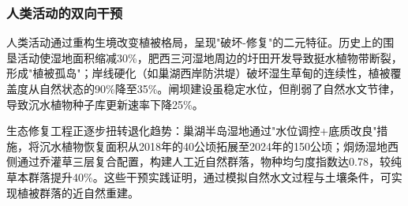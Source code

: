 \subsubsection{人类活动的双向干预}
人类活动通过重构生境改变植被格局，呈现"破坏-修复"的二元特征。历史上的围垦活动使湿地面积缩减30\%，肥西三河湿地周边的圩田开发导致挺水植物带断裂，形成"植被孤岛"；岸线硬化（如巢湖西岸防洪堤）破坏湿生草甸的连续性，植被覆盖度从自然状态的90\%降至35\%。闸坝建设虽稳定水位，但削弱了自然水文节律，导致沉水植物种子库更新速率下降25\%。

生态修复工程正逐步扭转退化趋势：巢湖半岛湿地通过"水位调控+底质改良"措施，将沉水植物恢复面积从2018年的40公顷拓展至2024年的150公顷；烔炀湿地西侧通过乔灌草三层复合配置，构建人工近自然群落，物种均匀度指数达0.78，较纯草本群落提升40\%。这些干预实践证明，通过模拟自然水文过程与土壤条件，可实现植被群落的近自然重建。
